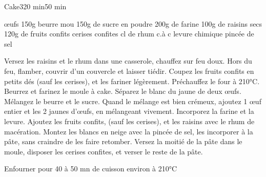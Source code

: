 \begin{recette}{Cake}{3}{20 min}{50 min}
\begin{ingredients}
 œufs
\ingredient 150g beurre mou
\ingredient 150g de sucre en poudre
\ingredient 200g de farine
\ingredient 100g de raisins secs
\ingredient 120g de fruits confits
\ingredient cerises confites
 cl de rhum
 c.à c levure chimique
 pincée de sel
\end{ingredients}

\begin{preparation}
\etape Versez les raisins et le rhum dans une casserole, chauffez sur feu doux. Hors du feu, flamber, couvrir d'un couvercle et laisser tiédir.
\etape Coupez les fruits confits en petits dés (sauf les cerises), et les fariner légèrement.
\etape Préchauffez le four à 210°C. Beurrez et farinez le moule à cake.
\etape Séparez le blanc du jaune de deux œufs.
\etape Mélangez le beurre et le sucre. Quand le mélange est bien crémeux, ajoutez 1 œuf entier et les 2 jaunes d'œufs, en mélangeant vivement.
\etape Incorporez la farine et la levure.
\etape Ajoutez les fruits confits, (sauf les cerises), et les raisins avec le rhum de macération.
\etape Montez les blancs en neige avec la pincée de sel, les incorporer à la pâte, sans craindre de les faire retomber.
\etape Versez la moitié de la pâte dans le moule, disposer les cerises confites, et verser le reste de la pâte.

\end{preparation}

\begin{cuisson}
Enfourner pour 40 à 50 mn de cuisson environ à 210°C
\end{cuisson}
\end{recette}

